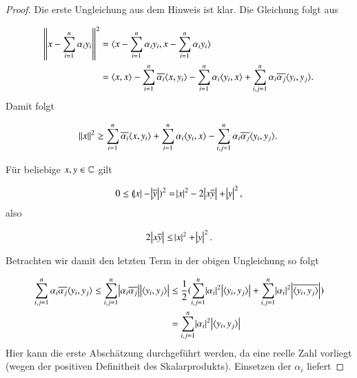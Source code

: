 \begin{proof}
  Die erste Ungleichung aus dem Hinweis ist klar. Die Gleichung folgt aus

  \begin{equation*}
    \begin{split}
      \norm{x-\sum_{i=1}^n{\alpha_i y_i}}^2
      &= \langle {x-\sum_{i=1}^n{\alpha_i y_i}},{x-\sum_{i=1}^n{\alpha_i y_i}} \rangle \\
      &= \langle {x},{x} \rangle - \sum_{i=1}^n{\overline{\alpha_i} \langle {x},{y_i} \rangle} - \sum_{i=1}^n{\alpha_i \langle {y_i},{x} \rangle + \sum_{i,j=1}^n{\alpha_i \overline{\alpha_j} \langle {y_i},{y_j} \rangle}}.
    \end{split}
  \end{equation*}
  Damit folgt

  \begin{equation*}
    \norm{x}^2 \geq \sum_{i=1}^n{\overline{\alpha_i} \langle {x},{y_i} \rangle} + \sum_{i=1}^n{\alpha_i \langle {y_i},{x} \rangle - \sum_{i,j=1}^n{\alpha_i \overline{\alpha_j} \langle {y_i},{y_j} \rangle}}.
  \end{equation*}

  Für beliebige $x,y \in \mathbb{C}$ gilt

  \begin{equation*}
    0 \leq (\abs{x}-\abs{\overline{y}})^2 = \abs{x}^2 - 2\abs{x\overline{y}} + \abs{y}^2,
  \end{equation*}
  also

  \begin{equation*}
    2\abs{x\overline{y}} \leq \abs{x}^2 + \abs{y}^2.
  \end{equation*}

  Betrachten wir damit den letzten Term in der obigen Ungleichung so folgt

  \begin{equation*}
    \begin{split}
      \sum_{i,j=1}^n{\alpha_i \overline{\alpha_j}\langle {y_i},{y_j} \rangle}
      \leq \sum_{i,j=1}^n{\abs{\alpha_i\overline{\alpha_j}}\abs{\langle {y_i},{y_j} \rangle}}
      &\leq \frac{1}{2}(\sum_{i,j=1}^n{\abs{\alpha_i}^2\abs{\langle {y_i},{y_j} \rangle}} + \sum_{i,j=1}^n{\abs{\alpha_i}^2 \abs{\overline{\langle {y_i},{y_j} \rangle}}}) \\
      &= \sum_{i,j=1}^n{\abs{\alpha_i}^2\abs{\langle {y_i},{y_j} \rangle}}
    \end{split}
  \end{equation*}
  Hier kann die erste Abschätzung durchgeführt werden, da eine reelle Zahl vorliegt (wegen der positiven Definitheit des Skalarprodukts). Einsetzen der $\alpha_i$ liefert


\end{proof}
